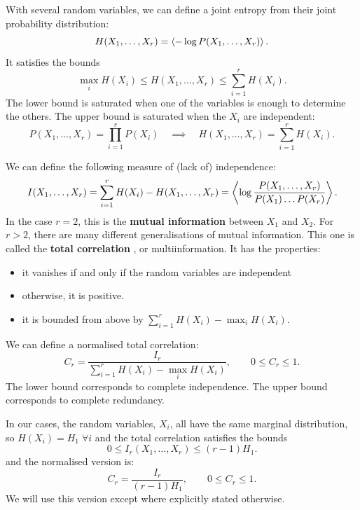 \documentclass[12pt]{article}
\begin{document}
With several random variables, we can define a joint entropy from their joint probability distribution:
%
\begin{equation}\label{eq:jointent}
  H(X_1,\ldots,X_r) = \left\langle -\log P(X_1,\ldots,X_r) \right\rangle.
\end{equation}
%
It satisfies the bounds
%
\begin{equation}\label{eq:entbounds}
  \max_i H(X_i) \leq H(X_1,\ldots,X_r) \leq \sum_{i=1}^r H(X_i).
\end{equation}
%
The lower bound is saturated when one of the variables is enough to determine the others. The upper bound is saturated when the $X_i$ are independent:
%
\begin{equation}\label{eq:indent}
  P(X_1,\ldots,X_r) = \prod_{i=1}^r P(X_i)
  \quad \implies \quad
  H(X_1,\ldots,X_r) = \sum_{i=1}^r H(X_i).
\end{equation}
%

We can define the following measure of (lack of) independence:
%
\begin{equation}\label{eq:mutinf}
  I(X_1,\ldots,X_r) = \sum_{i=1}^r H(X_i) - H(X_1,\ldots,X_r) = \left\langle  \log \frac{P(X_1,\ldots,X_r)}{P(X_1)\ldots P(X_r)}  \right\rangle.
\end{equation}
%
In the case $r=2$, this is the \textbf{mutual information} between $X_1$ and $X_2$. For $r>2$, there are many different generalisations of mutual information. This one is called the \textbf{total correlation} \cite{Watanabe:1960:ITA:1661258.1661265}, or multiinformation. It has the properties:
%
\begin{itemize}
  \item it vanishes if and only if the random variables are independent
  \item otherwise, it is positive.
  \item it is bounded from above by $\sum_{i=1}^r H(X_i) - \max_i H(X_i)$.
\end{itemize}
%
We can define a normalised total correlation:
%
\begin{equation}\label{eq:normmutinfgen}
  C_r = \frac{I_r}{\sum_{i=1}^r H(X_i) - \max_i H(X_i)}, \qquad 0 \leq C_r \leq 1.
\end{equation}
%
The lower bound corresponds to complete independence. The upper bound corresponds to complete redundancy.

In our cases, the random variables, $X_i$, all have the same marginal distribution, so $H(X_i)=H_1\; \forall i$ and the total correlation satisfies the bounds
%
\begin{equation}\label{eq:mutinfbounds}
  0 \leq I_r(X_1,\ldots,X_r) \leq (r-1)H_1.
\end{equation}
%
and the normalised version is:
%
\begin{equation}\label{eq:normmutinf}
  C_r = \frac{I_r}{(r-1)H_1}, \qquad 0 \leq C_r \leq 1.
\end{equation}
%
We will use this version except where explicitly stated otherwise.
\end{document}
